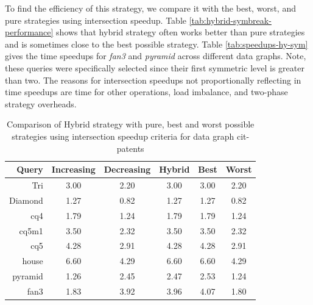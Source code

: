 To find the efficiency of this strategy, we compare it with the best, worst, and pure strategies using intersection speedup.
Table \ref{tab:hybrid-symbreak-performance} shows that hybrid strategy often works better than pure strategies and is sometimes close to the best possible strategy.
Table \ref{tab:speedups-hy-sym} gives the time speedups for \textit{fan3} and \textit{pyramid} across different data graphs.
Note, these queries were specifically selected since their first symmetric level is greater than two.
The reasons for intersection speedups not proportionally reflecting in time speedups are time for other operations, load imbalance, and two-phase strategy overheads.

\begin{table}[]
    \centering
    \caption{Comparison of Hybrid strategy with pure, best and worst possible strategies using intersection speedup criteria for data graph cit-patents}
    \begin{tabular}{r|ccccc}
        \hline
        \textbf{Query} & \textbf{Increasing} & \textbf{Decreasing} & \textbf{Hybrid} & \textbf{Best} & \textbf{Worst} \\\hline
        Tri            & 3.00                & 2.20                & 3.00            & 3.00          & 2.20           \\
        Diamond        & 1.27                & 0.82                & 1.27            & 1.27          & 0.82           \\
        cq4            & 1.79                & 1.24                & 1.79            & 1.79          & 1.24           \\
        cq5m1          & 3.50                & 2.32                & 3.50            & 3.50          & 2.32           \\
        cq5            & 4.28                & 2.91                & 4.28            & 4.28          & 2.91           \\
        house          & 6.60                & 4.29                & 6.60            & 6.60          & 4.29           \\
        pyramid        & 1.26                & 2.45                & 2.47            & 2.53          & 1.24           \\
        fan3           & 1.83                & 3.92                & 3.96            & 4.07          & 1.80           \\

\end{tabular}
\end{table}
